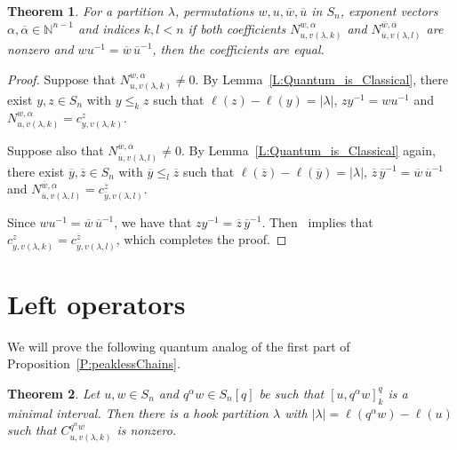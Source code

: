\documentclass[12pt,oneside,reqno]{amsart}
\newtheorem{theorem}{Theorem}[section]
\theoremstyle{definition}
\numberwithin{equation}{section}
\newcommand{\NN}{{\mathbb N}}
\begin{document}
\begin{theorem}\label{Th:quantumIndependence}
  For a partition $\lambda$, permutations $w,u,\overline{w},\overline{u}$ in $S_n$, exponent vectors
  $\alpha,\overline{\alpha}\in\NN^{n-1}$ and indices $k,l<n$
  if both coefficients $N^{w,\alpha}_{u,v(\lambda,k)}$ and
  $N^{\overline{w},\overline{\alpha}}_{\overline{u},v(\lambda,l)}$ are nonzero and $wu^{-1}=\overline{w}\,\overline{u}^{-1}$,
  then the coefficients are equal.
 \end{theorem}
\begin{proof}
  Suppose that $N^{w,\alpha}_{u,v(\lambda,k)}\neq 0$.
  By Lemma~\ref{L:Quantum_is_Classical}, there exist $y,z\in S_n$ with $y\leq_k z$ such that $\ell(z)-\ell(y)=|\lambda|$,
  $zy^{-1}=wu^{-1}$  and    $N^{w,\alpha}_{u,v(\lambda,k)}=c^{z}_{y,v(\lambda,k)}$.

  Suppose also that $N^{\overline{w},\overline{\alpha}}_{\overline{u},v(\lambda,l)}\neq 0$.
  By Lemma~\ref{L:Quantum_is_Classical} again, there exist  $\overline{y},\overline{z}\in S_n$ with
  $\overline{y}\leq_l \overline{z}$ such that $\ell(\overline{z})-\ell(\overline{y})=|\lambda|$,
  $\overline{z}\,\overline{y}^{-1}=\overline{w}\,\overline{u}^{-1}$ and   
  $N^{\overline{w},\alpha}_{\overline{u},v(\lambda,l)}=c^{\overline{z}}_{\overline{y},v(\lambda,l)}$.

  Since $w u^{-1}= \overline{w}\,\overline{u}^{-1}$, we have that
  $zy^{-1}=\overline{z}\,\overline{y}^{-1}$.
  Then~\cite[Thm.\ E]{BS-Bruhat} implies that $c^{z}_{y,v(\lambda,k)}=c^{\overline{z}}_{\overline{y},v(\lambda,l)}$,
  which completes the proof.
\end{proof}

%
\section{Left operators}
\label{left-operators}

We will prove the following quantum analog of the first part of Proposition~\ref{P:peaklessChains}.

\begin{theorem}
    \label{Th:nonZero}
    Let $u,w\in S_n$ and $q^\alpha w\in S_n[q]$ be such that $[u,q^\alpha w]^q_k$ is a minimal interval.
    Then there is a hook partition $\lambda$ with $|\lambda|=\ell(q^\alpha w)-\ell(u)$ such that
    $C^{q^\alpha w}_{u,v(\lambda,k)}$ is nonzero.
\end{theorem}
\end{document}
